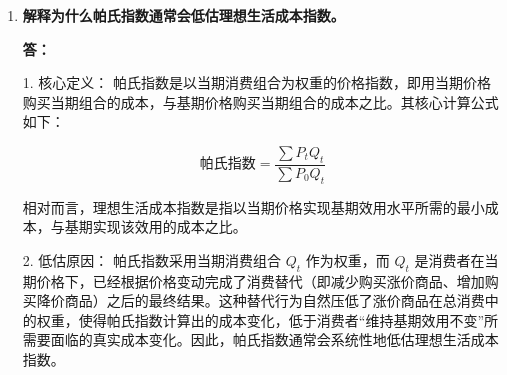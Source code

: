 \begin{enumerate}[label=\textbf{\arabic*.}, leftmargin=*]
			1. 替代偏误：拉氏指数固定了基期的消费篮子，没有考虑消费者的替代行为。在计算机价格大幅下跌后，消费者理性的选择是增加计算机的购买量，以替代其他价格相对更高的商品。然而，CPI 仍然以基期的固定权重进行计算，无法反映消费者通过调整消费结构所带来的成本节约，因此高估了实际的生活成本。
			
			2. 质量变化偏误：CPI 未能充分核算商品质量的提升。在过去20年中，计算机价格下跌的同时，其性能、算力和功能等质量指标出现了飞跃式的提升。CPI 往往将这种质量提升带来的巨大效用增益，误判为单纯的商品价格下降，从而低估了消费者的真实购买力，这也进一步导致了对生活成本的高估。
			
			\item \textbf{解释为什么帕氏指数通常会低估理想生活成本指数。}
			
			\textbf{答：}
			
			1. 核心定义：
			帕氏指数是以当期消费组合为权重的价格指数，即用当期价格购买当期组合的成本，与基期价格购买当期组合的成本之比。其核心计算公式如下：

				$$\text{帕氏指数} = \frac{\sum P_t Q_t}{\sum P_0 Q_t}$$

			相对而言，理想生活成本指数是指以当期价格实现基期效用水平所需的最小成本，与基期实现该效用的成本之比。
			
			2. 低估原因：
			帕氏指数采用当期消费组合 $Q_t$ 作为权重，而 $Q_t$ 是消费者在当期价格下，已经根据价格变动完成了消费替代（即减少购买涨价商品、增加购买降价商品）之后的最终结果。这种替代行为自然压低了涨价商品在总消费中的权重，使得帕氏指数计算出的成本变化，低于消费者“维持基期效用不变”所需要面临的真实成本变化。因此，帕氏指数通常会系统性地低估理想生活成本指数。
		\end{enumerate}
		\newpage

